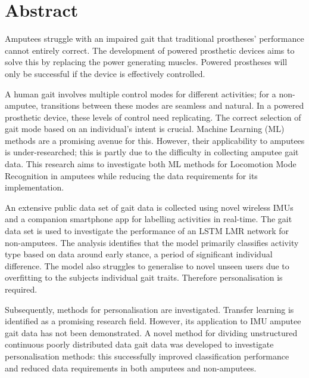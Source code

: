 \chapter*{Abstract} %
Amputees struggle with an impaired gait that traditional prostheses' performance cannot entirely correct. The development of powered prosthetic devices aims to solve this by replacing the power generating muscles. Powered prostheses will only be successful if the device is effectively controlled.

A human gait involves multiple control modes for different activities; for a non-amputee, transitions between these modes are seamless and natural. In a powered prosthetic device, these levels of control need replicating. The correct selection of gait mode based on an individual's intent is crucial. Machine Learning (ML) methods are a promising avenue for this. However, their applicability to amputees is under-researched; this is partly due to the difficulty in collecting amputee gait data. This research aims to investigate both ML methods for Locomotion Mode Recognition in amputees while reducing the data requirements for its implementation.

An extensive public data set of gait data is collected using novel wireless IMUs and a companion smartphone app for labelling activities in real-time. The gait data set is used to investigate the performance of an LSTM LMR network for non-amputees. The analysis identifies that the model primarily classifies activity type based on data around early stance, a period of significant individual difference. The model also struggles to generalise to novel unseen users due to overfitting to the subjects individual gait traits. Therefore personalisation is required. 

Subsequently, methods for personalisation are investigated. Transfer learning is identified as a promising research field. However, its application to IMU amputee gait data has not been demonstrated. A novel method for dividing unstructured continuous poorly distributed data gait data was developed to investigate personalisation methods: this successfully improved classification performance and reduced data requirements in both amputees and non-amputees.
